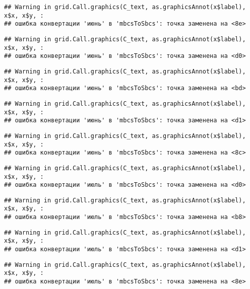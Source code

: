 \documentclass[
]{article}
\begin{document}
\begin{verbatim}
## Warning in grid.Call.graphics(C_text, as.graphicsAnnot(x$label), x$x, x$y, :
## ошибка конвертации 'июнь' в 'mbcsToSbcs': точка заменена на <8e>
\end{verbatim}

\begin{verbatim}
## Warning in grid.Call.graphics(C_text, as.graphicsAnnot(x$label), x$x, x$y, :
## ошибка конвертации 'июнь' в 'mbcsToSbcs': точка заменена на <d0>
\end{verbatim}

\begin{verbatim}
## Warning in grid.Call.graphics(C_text, as.graphicsAnnot(x$label), x$x, x$y, :
## ошибка конвертации 'июнь' в 'mbcsToSbcs': точка заменена на <bd>
\end{verbatim}

\begin{verbatim}
## Warning in grid.Call.graphics(C_text, as.graphicsAnnot(x$label), x$x, x$y, :
## ошибка конвертации 'июнь' в 'mbcsToSbcs': точка заменена на <d1>
\end{verbatim}

\begin{verbatim}
## Warning in grid.Call.graphics(C_text, as.graphicsAnnot(x$label), x$x, x$y, :
## ошибка конвертации 'июнь' в 'mbcsToSbcs': точка заменена на <8c>
\end{verbatim}

\begin{verbatim}
## Warning in grid.Call.graphics(C_text, as.graphicsAnnot(x$label), x$x, x$y, :
## ошибка конвертации 'июль' в 'mbcsToSbcs': точка заменена на <d0>
\end{verbatim}

\begin{verbatim}
## Warning in grid.Call.graphics(C_text, as.graphicsAnnot(x$label), x$x, x$y, :
## ошибка конвертации 'июль' в 'mbcsToSbcs': точка заменена на <b8>
\end{verbatim}

\begin{verbatim}
## Warning in grid.Call.graphics(C_text, as.graphicsAnnot(x$label), x$x, x$y, :
## ошибка конвертации 'июль' в 'mbcsToSbcs': точка заменена на <d1>
\end{verbatim}

\begin{verbatim}
## Warning in grid.Call.graphics(C_text, as.graphicsAnnot(x$label), x$x, x$y, :
## ошибка конвертации 'июль' в 'mbcsToSbcs': точка заменена на <8e>
\end{verbatim}
\end{document}

